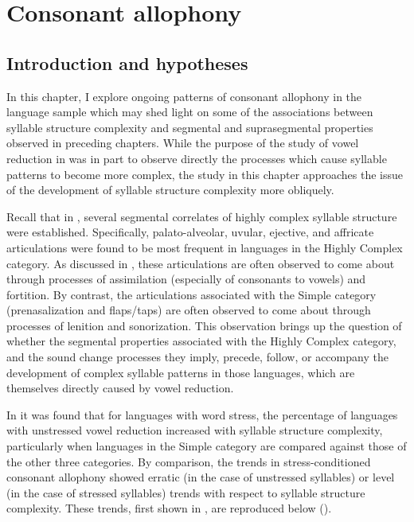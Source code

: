 \chapter{Consonant allophony}\label{sec:7}
\section{Introduction and hypotheses}\label{sec:7.1}

  In this chapter, I explore ongoing patterns of consonant allophony in the language sample which may shed light on some of the associations between syllable structure complexity and segmental and suprasegmental properties observed in preceding chapters. While the purpose of the study of vowel reduction in  was in part to observe directly the processes which cause syllable patterns to become more complex, the study in this chapter approaches the issue of the development of syllable structure complexity more obliquely. 

  Recall that in , several segmental correlates of highly complex syllable structure were established. Specifically, palato-alveolar, uvular, ejective, and affricate articulations were found to be most frequent in languages in the Highly Complex category. As discussed in , these articulations are often observed to come about through processes of assimilation (especially of consonants to vowels) and fortition. By contrast, the articulations associated with the Simple category (prenasalization and flaps/taps) are often observed to come about through processes of lenition and sonorization. This observation brings up the question of whether the segmental properties associated with the Highly Complex category, and the sound change processes they imply, precede, follow, or accompany the development of complex syllable patterns in those languages, which are themselves directly caused by vowel reduction.

  In  it was found that for languages with word stress, the percentage of languages with unstressed vowel reduction increased with syllable structure complexity, particularly when languages in the Simple category are compared against those of the other three categories. By comparison, the trends in stress-conditioned consonant allophony showed erratic (in the case of unstressed syllables) or level (in the case of stressed syllables) trends with respect to syllable structure complexity. These trends, first shown in , are reproduced below ().

